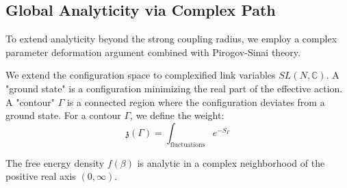 \subsection{Global Analyticity via Complex Path}
\label{subsec:complex-path}

To extend analyticity beyond the strong coupling radius, we employ a complex parameter deformation argument combined with Pirogov-Sinai theory.

\begin{definition}
We extend the configuration space to complexified link variables $SL(N, \mathbb{C})$.
A "ground state" is a configuration minimizing the real part of the effective action.
A "contour" $\Gamma$ is a connected region where the configuration deviates from a ground state.
For a contour $\Gamma$, we define the weight:
\[
\mathfrak{z}(\Gamma) = \int_{\text{fluctuations}} e^{-S_\Gamma}
\]
\end{definition}

\begin{theorem}
\label{thm:global_analyticity}
The free energy density $f(\beta)$ is analytic in a complex neighborhood of the positive real axis $(0, \infty)$.
\end{theorem}

